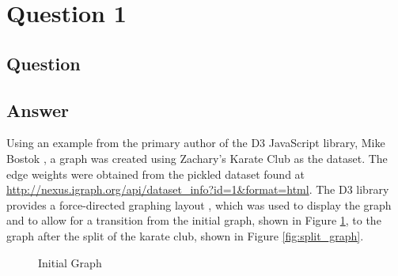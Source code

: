 \section{Question 1}

\subsection{Question}


\subsection{Answer}
Using an example from the primary author of the D3 JavaScript library, Mike Bostok \cite{d3:bostok12}, a graph was created using Zachary's Karate Club as the dataset. The edge weights were obtained from the pickled \cite{py:pickle} dataset found at \url{http://nexus.igraph.org/api/dataset_info?id=1&format=html}. The D3 library provides a force-directed graphing layout \cite{d3:force14}, which was used to display the graph and to allow for a transition from the initial graph, shown in Figure \ref{fig:init_graph}, to the graph after the split of the karate club, shown in Figure \ref{fig:split_graph}.

\begin{figure}[h!]
\centering
{}
\caption{Initial Graph}
\label{fig:init_graph}
\end{figure}

